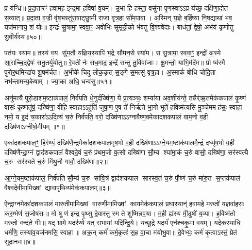 प्र य॑न्धि॥ प्र॒दा॒तारꣳ॑ हवामह॒ इन्द्र॒मा ह॒विषा॑ व॒यम्। उ॒भा हि हस्ता॒ वसु॑ना पृ॒णस्वाऽऽप्र य॑च्छ॒ दक्षि॑णा॒दोत स॒व्यात्॥ प्र॒दा॒ता व॒ज्री वृ॑ष॒भस्तु॑रा॒षाट्छु॒ष्मी राजा॑ वृत्र॒हा सो॑म॒पावा। अ॒स्मिन् य॒ज्ञे ब॒र्\mbox{}हिष्या नि॒षद्याथा॑ भव॒ यज॑मानाय॒ शं योः॥ इन्द्रः॑ सु॒त्रामा॒ स्ववा॒ꣳ॒ अवो॑भिः सुमृडी॒को भ॑वतु वि॒श्ववे॑दाः। बाध॑तां॒ द्वेषो॒ अभ॑यं कृणोतु सु॒वीर्य॑स्य॥५०॥

पत॑यः स्याम॥ तस्य॑ व॒य सु॑म॒तौ य॒ज्ञिय॒स्यापि॑ भ॒द्रे सौ॑मन॒से स्या॑म। स सु॒त्रामा॒ स्ववा॒ꣳ॒ इन्द्रो॑ अ॒स्मे आ॒राच्चि॒द्द्वेषः॑ सनु॒तर्यु॑योतु॥ रे॒वतीर्नः सध॒माद॒ इन्द्रे॑ सन्तु तु॒विवा॑जाः। क्षु॒मन्तो॒ याभि॒र्मदे॑म॥ प्रो ष्व॑स्मै पुरोर॒थमिन्द्रा॑य शू॒षम॑र्चत। अ॒भीके॑ चिदु लोक॒कृत् स॒ङ्गे स॒मत्सु॑ वृत्र॒हा। अ॒स्माकं॑ बोधि चोदि॒ता नभ॑न्तामन्य॒केषाम्। ज्या॒का अधि॒ धन्व॑सु॥५१॥

{\anuvakamend[{ज॒रसा॒ मा ते॑ हर्यश्व सु॒वीर्य॒स्याध्येकं॑ च॥13॥}]}

\setcounter{anuvakam}{0}
अनु॑मत्यै पुरो॒डाश॑म॒ष्टाक॑पालं॒ निर्व॑पति धे॒नुर्दख्षि॑णा॒ ये प्र॒त्यञ्चः॒ शम्या॑या अव॒शीय॑न्ते॒ तन्नैर्॑ऋ॒तमेक॑कपालं कृ॒ष्णं वासः॑ कृ॒ष्णतू॑षं॒ दख्षि॑णा॒ वीहि॒ स्वाहाऽऽहु॑तिं जुषा॒ण ए॒ष ते॑ निर्\mbox{}ऋते भा॒गो भूते॑ ह॒विष्म॑त्यसि मु॒ञ्चेममह॑सः॒ स्वाहा॒ नमो॒ य इ॒दं च॒कारा॑ऽऽदि॒त्यं च॒रुं निर्व॑पति॒ वरो॒ दख्षि॑णाऽऽग्नावैष्ण॒वमेका॑दशकपालं वाम॒नो व॒ही दख्षि॑णाऽग्नीषो॒मीयम्॥१॥

एका॑दशकपाल॒ꣳ॒ हिर॑ण्यं॒ दख्षि॑णै॒न्द्रमेका॑दशकपालमृष॒भो व॒ही दख्षि॑णाऽऽग्ने॒यम॒ष्टाक॑पालमै॒न्द्रं दध्यृ॑ष॒भो व॒ही दख्षि॑णैन्द्रा॒ग्नं द्वाद॑शकपालं वैश्वदे॒वं च॒रुं प्र॑थम॒जो व॒त्सो दख्षि॑णा सौ॒म्य श्या॑मा॒कं च॒रुं वासो॒ दख्षि॑णा॒ सर॑स्वत्यै च॒रु सर॑स्वते च॒रुं मि॑थु॒नौ गावौ॒ दख्षि॑णा॥२॥

{\anuvakamend[{अ॒ग्नी॒षो॒मीयं॒ चतु॑स्त्रिशच्च॥१॥}]}

आ॒ग्ने॒यम॒ष्टाक॑पालं॒ निर्व॑पति सौ॒म्यं च॒रु सा॑वि॒त्रं द्वाद॑शकपाल सारस्व॒तं च॒रुं पौ॒ष्णं च॒रुं मा॑रु॒त स॒प्तक॑पालं वैश्वदे॒वीमा॒मिख्षां द्यावापृथि॒व्य॑मेक॑कपालम्॥३॥

{\anuvakamend[{आ॒ग्ने॒यम॒ष्टाद॑श॥२॥}]}

ऐ॒न्द्रा॒ग्नमेका॑दशकपालं मारु॒तीमा॒मिख्षां वारु॒णीमा॒मिख्षां का॒यमेक॑कपालं प्रघा॒स्यान्॑ हवामहे म॒रुतो॑ य॒ज्ञवा॑हसः कर॒म्भेण॑ स॒जोष॑सः॥ मो षू ण॑ इन्द्र पृ॒थ्सु दे॒वास्तु॑ स्म ते शुष्मिन्नव॒या। म॒ही ह्य॑स्य मी॒ढुषो॑ य॒व्या। ह॒विष्म॑तो म॒रुतो॒ वन्द॑ते॒ गीः॥ यद् ग्रामे॒ यदर॑ण्ये॒ यत् स॒भायां॒ यदि॑न्द्रि॒ये। यच्छू॒द्रे यद॒र्य॑ एन॑श्चकृ॒मा व॒यम्। यदेक॒स्याधि॒ धर्म॑णि॒ तस्या॑व॒यज॑नमसि॒ स्वाहा॥ अक्र॒न् कर्म॑ कर्म॒कृतः॑ स॒ह वा॒चा म॑योभु॒वा॥ दे॒वेभ्यः॒ कर्म॑ कृ॒त्वाऽस्तं॒ प्रेत॑ सुदानवः॥४॥

